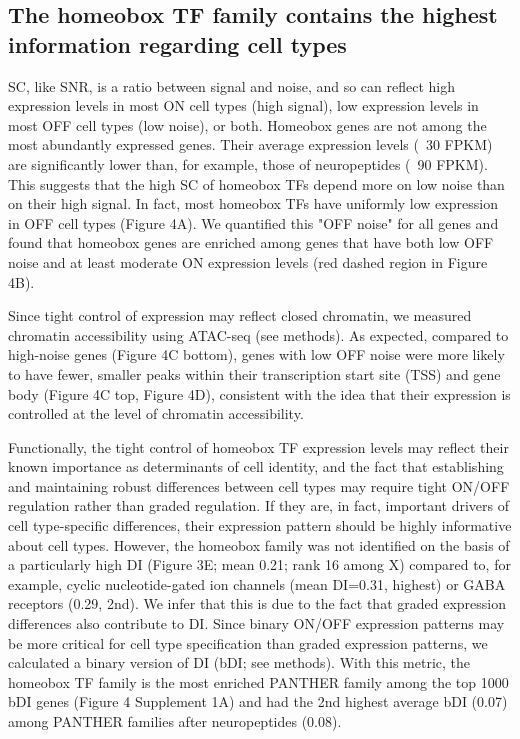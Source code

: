 \subsection{The homeobox TF family contains the highest information regarding cell types}

SC, like SNR, is a ratio between signal and noise, and so can reflect high expression levels in most ON cell types (high signal), low expression levels in most OFF cell types (low noise), or both. Homeobox genes are not among the most abundantly expressed genes. Their average expression levels (~30 FPKM) are significantly lower than, for example, those of neuropeptides (~90 FPKM). This suggests that the high SC of homeobox TFs depend more on low noise than on their high signal. In fact, most  homeobox TFs have uniformly low expression in OFF cell types (Figure 4A). We quantified this "OFF noise" for all genes and found that homeobox genes are enriched among genes that have both low OFF noise and at least moderate ON expression levels (red dashed region in Figure 4B).

Since tight control of expression may reflect closed chromatin, we measured chromatin accessibility using ATAC-seq (see methods). As expected, compared to high-noise genes (Figure 4C bottom), genes with low OFF noise were more likely to have fewer, smaller peaks within their transcription start site (TSS) and gene body (Figure 4C top, Figure 4D), consistent with the idea that their expression is controlled at the level of chromatin accessibility.

Functionally, the tight control of homeobox TF expression levels may reflect their known importance as determinants of cell identity, and the fact that establishing and maintaining robust differences between cell types may require tight ON/OFF regulation rather than graded regulation. If they are, in fact, important drivers of cell type-specific differences, their expression pattern should be highly informative about cell types. However, the homeobox family was not identified on the basis of a particularly high DI (Figure 3E; mean 0.21; rank 16 among X) compared to, for example, cyclic nucleotide-gated ion channels (mean DI=0.31, highest) or GABA receptors (0.29, 2nd). We infer that this is due to the fact that graded expression differences also contribute to DI. Since binary ON/OFF expression patterns may be more critical for cell type specification than graded expression patterns, we calculated a binary version of DI (bDI; see methods). With this metric, the homeobox TF family is the most enriched PANTHER family among the top 1000 bDI genes (Figure 4 Supplement 1A) and had the 2nd highest average bDI (0.07) among PANTHER families after neuropeptides (0.08).

